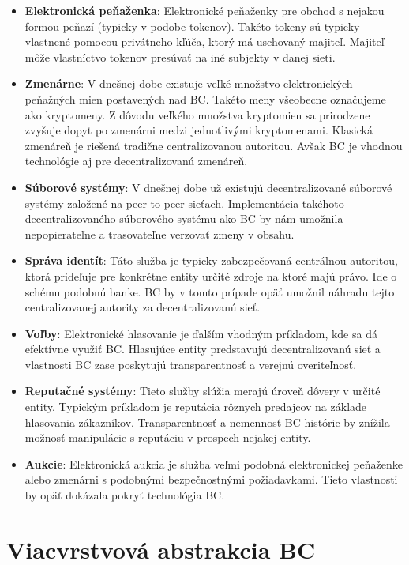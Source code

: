 \begin{itemize}
	\item \textbf{Elektronická peňaženka}: Elektronické peňaženky pre obchod s nejakou formou peňazí (typicky v podobe tokenov). Takéto tokeny sú typicky vlastnené pomocou privátneho kľúča, ktorý má uschovaný majiteľ. Majiteľ môže vlastníctvo tokenov presúvať na iné subjekty v danej sieti.
	\item \textbf{Zmenárne}: V dnešnej dobe existuje veľké množstvo elektronických peňažných mien postavených nad BC. Takéto meny všeobecne označujeme ako kryptomeny. Z dôvodu veľkého množstva kryptomien sa prirodzene zvyšuje dopyt po zmenárni medzi jednotlivými kryptomenami. Klasická zmenáreň je riešená tradične centralizovanou autoritou. Avšak BC je vhodnou technológie aj pre decentralizovanú zmenáreň.
	\item \textbf{Súborové systémy}: V dnešnej dobe už existujú decentralizované súborové systémy založené na peer-to-peer sieťach. Implementácia takéhoto decentralizovaného súborového systému ako BC by nám umožnila nepopierateľne a trasovateľne verzovať zmeny v obsahu.
	\item \textbf{Správa identít}: Táto služba je typicky zabezpečovaná centrálnou autoritou, ktorá prideľuje pre konkrétne entity určité zdroje na ktoré majú právo. Ide o schému podobnú banke. BC by v tomto prípade opäť umožnil náhradu tejto centralizovanej autority za decentralizovanú sieť.
	\item \textbf{Voľby}: Elektronické hlasovanie je ďalším vhodným príkladom, kde sa dá efektívne využiť BC. Hlasujúce entity predstavujú decentralizovanú sieť a vlastnosti BC zase poskytujú transparentnosť a verejnú overiteľnosť.
	\item \textbf{Reputačné systémy}: Tieto služby slúžia merajú úroveň dôvery v určité entity. Typickým príkladom je reputácia rôznych predajcov na základe hlasovania zákazníkov. Transparentnosť a nemennosť BC histórie by znížila možnosť manipulácie s reputáciu v prospech nejakej entity.
	\item \textbf{Aukcie}: Elektronická aukcia je služba veľmi podobná elektronickej peňaženke alebo zmenárni s podobnými bezpečnostnými požiadavkami. Tieto vlastnosti by opäť dokázala pokryť technológia BC.
\end{itemize}

\section{Viacvrstvová abstrakcia BC}

